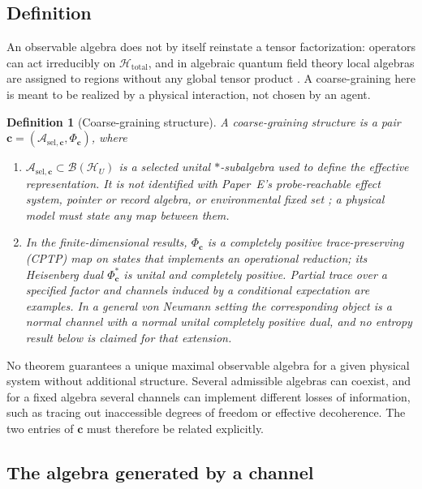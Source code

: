 \documentclass[12pt,a4paper]{article}
\newtheorem{definition}[theorem]{Definition}
\begin{document}
\subsection{Definition}

An observable algebra does not by itself reinstate a tensor factorization: operators can act irreducibly on $\mathcal H_{\mathrm{total}}$, and in algebraic quantum field theory local algebras are assigned to regions without any global tensor product \cite{Haag1996}. A coarse-graining here is meant to be realized by a physical interaction, not chosen by an agent.

\begin{definition}[Coarse-graining structure]
\label{def:coarse}
A coarse-graining structure is a pair $\mathbf c=(\mathcal A_{\mathrm{sel},\mathbf c},\Phi_{\mathbf c})$, where
\begin{enumerate}
\item $\mathcal A_{\mathrm{sel},\mathbf c}\subset\mathcal B(\mathcal H_U)$ is a selected unital $*$-subalgebra used to define the effective representation. It is not identified with Paper~E's probe-reachable effect system, pointer or record algebra, or environmental fixed set \cite{Liu2026PaperE}; a physical model must state any map between them.
\item In the finite-dimensional results, $\Phi_{\mathbf c}$ is a completely positive trace-preserving (CPTP) map on states that implements an operational reduction; its Heisenberg dual $\Phi_{\mathbf c}^*$ is unital and completely positive. Partial trace over a specified factor and channels induced by a conditional expectation are examples. In a general von Neumann setting the corresponding object is a normal channel with a normal unital completely positive dual, and no entropy result below is claimed for that extension.
\end{enumerate}
\end{definition}

No theorem guarantees a unique maximal observable algebra for a given physical system without additional structure. Several admissible algebras can coexist, and for a fixed algebra several channels can implement different losses of information, such as tracing out inaccessible degrees of freedom or effective decoherence. The two entries of $\mathbf c$ must therefore be related explicitly.

\subsection{The algebra generated by a channel}
\end{document}
